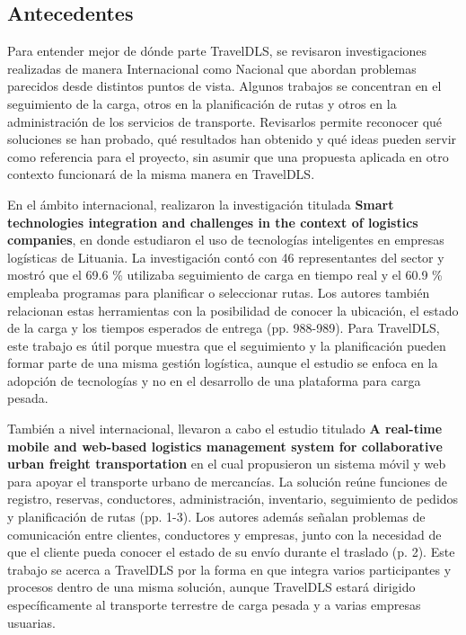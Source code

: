 \subsection{Antecedentes}
\label{sec:antecedentes}

Para entender mejor de dónde parte TravelDLS, se revisaron investigaciones realizadas de manera Internacional como Nacional que abordan problemas parecidos desde distintos puntos de vista. Algunos trabajos se concentran en el seguimiento de la carga, otros en la planificación de rutas y otros en la administración de los servicios de transporte. Revisarlos permite reconocer qué soluciones se han probado, qué resultados han obtenido y qué ideas pueden servir como referencia para el proyecto, sin asumir que una propuesta aplicada en otro contexto funcionará de la misma manera en TravelDLS.

\label{ant:pauzuoliene}
En el ámbito internacional, \textcite{pauzuoliene2024smart} realizaron la investigación titulada \textbf{Smart technologies integration and challenges in the context of logistics companies}, en donde estudiaron el uso de tecnologías inteligentes en empresas logísticas de Lituania. La investigación contó con 46 representantes del sector y mostró que el 69.6 \% utilizaba seguimiento de carga en tiempo real y el 60.9 \% empleaba programas para planificar o seleccionar rutas. Los autores también relacionan estas herramientas con la posibilidad de conocer la ubicación, el estado de la carga y los tiempos esperados de entrega (pp. 988-989). Para TravelDLS, este trabajo es útil porque muestra que el seguimiento y la planificación pueden formar parte de una misma gestión logística, aunque el estudio se enfoca en la adopción de tecnologías y no en el desarrollo de una plataforma para carga pesada.

\label{ant:sultan}
También a nivel internacional, \textcite{sultan2022real} llevaron a cabo el estudio titulado \textbf{A real-time mobile and web-based logistics management system for collaborative urban freight transportation} en el cual propusieron un sistema móvil y web para apoyar el transporte urbano de mercancías. La solución reúne funciones de registro, reservas, conductores, administración, inventario, seguimiento de pedidos y planificación de rutas (pp. 1-3). Los autores además señalan problemas de comunicación entre clientes, conductores y empresas, junto con la necesidad de que el cliente pueda conocer el estado de su envío durante el traslado (p. 2). Este trabajo se acerca a TravelDLS por la forma en que integra varios participantes y procesos dentro de una misma solución, aunque TravelDLS estará dirigido específicamente al transporte terrestre de carga pesada y a varias empresas usuarias.

